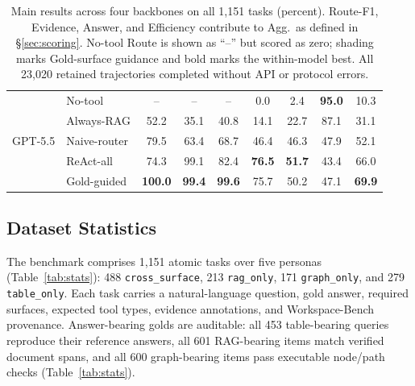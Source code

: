 \documentclass[11pt]{article}
\newcommand{\gcell}[1]{\cellcolor{guidanceblue}#1}
\begin{document}
\begin{table}[t]
\begin{tabular*}{\textwidth}{@{\extracolsep{\fill}}llccccccc}
\midrule
\multirow{5}{*}{GPT-5.5} & No-tool & -- & -- & -- & 0.0 & 2.4 & \textbf{95.0} & 10.3 \\
 & Always-RAG & 52.2 & 35.1 & 40.8 & 14.1 & 22.7 & 87.1 & 31.1 \\
 & Naive-router & 79.5 & 63.4 & 68.7 & 46.4 & 46.3 & 47.9 & 52.1 \\
 & ReAct-all & 74.3 & 99.1 & 82.4 & \textbf{76.5} & \textbf{51.7} & 43.4 & 66.0 \\
 & \gcell{Gold-guided} & \gcell{\textbf{100.0}} & \gcell{\textbf{99.4}} & \gcell{\textbf{99.6}} & \gcell{75.7} & \gcell{50.2} & \gcell{47.1} & \gcell{\textbf{69.9}} \\
\bottomrule
\end{tabular*}
\caption{Main results across four backbones on all 1{,}151 tasks (percent).
Route-F1, Evidence, Answer, and Efficiency contribute to Agg.\ as defined in
\S\ref{sec:scoring}. No-tool Route is shown as ``--'' but scored as zero;
shading marks Gold-surface guidance and bold marks the within-model best.
All 23{,}020 retained trajectories completed without API or protocol errors.}
\label{tab:main}
\end{table}
\subsection{Dataset Statistics}
\label{sec:stats}
The benchmark comprises 1{,}151 atomic tasks over five personas
(Table~\ref{tab:stats}): 488 \texttt{cross\_surface}, 213 \texttt{rag\_only},
171 \texttt{graph\_only}, and 279 \texttt{table\_only}. Each task carries a
natural-language question, gold answer, required surfaces, expected tool types,
evidence annotations, and Workspace-Bench provenance. Answer-bearing golds
are auditable: all 453 table-bearing queries reproduce their reference
answers, all 601 RAG-bearing items match verified document spans, and all 600
graph-bearing items pass executable node/path checks (Table~\ref{tab:stats}).
\end{document}
